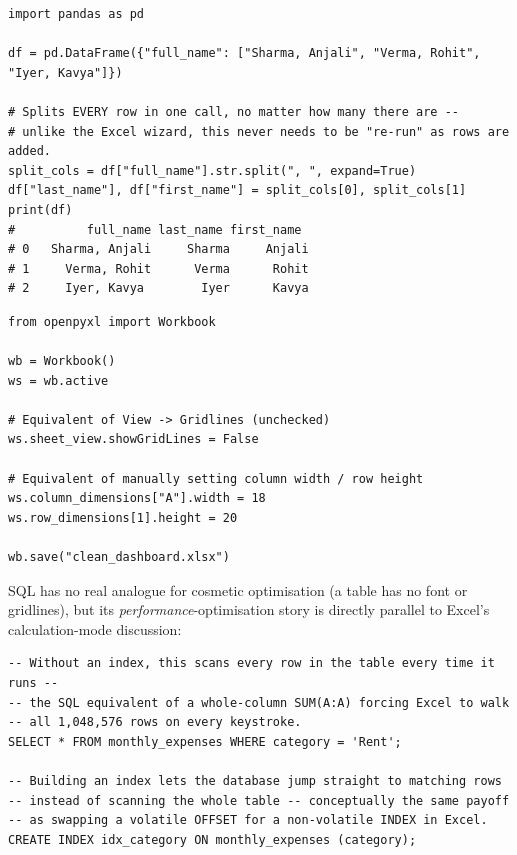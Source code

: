 \documentclass[11pt,a4paper]{article}
\begin{document}
\begin{lstlisting}[style=pythonstyle, caption={Text to Columns, the pandas way --- generalises automatically to any number of rows}]
import pandas as pd

df = pd.DataFrame({"full_name": ["Sharma, Anjali", "Verma, Rohit", "Iyer, Kavya"]})

# Splits EVERY row in one call, no matter how many there are --
# unlike the Excel wizard, this never needs to be "re-run" as rows are added.
split_cols = df["full_name"].str.split(", ", expand=True)
df["last_name"], df["first_name"] = split_cols[0], split_cols[1]
print(df)
#          full_name last_name first_name
# 0   Sharma, Anjali     Sharma     Anjali
# 1     Verma, Rohit      Verma      Rohit
# 2     Iyer, Kavya        Iyer      Kavya
\end{lstlisting}

\begin{lstlisting}[style=pythonstyle, caption={Cosmetic worksheet optimisation with openpyxl}]
from openpyxl import Workbook

wb = Workbook()
ws = wb.active

# Equivalent of View -> Gridlines (unchecked)
ws.sheet_view.showGridLines = False

# Equivalent of manually setting column width / row height
ws.column_dimensions["A"].width = 18
ws.row_dimensions[1].height = 20

wb.save("clean_dashboard.xlsx")
\end{lstlisting}

SQL has no real analogue for cosmetic optimisation (a table has no font or gridlines), but its \emph{performance}-optimisation story is directly parallel to Excel's calculation-mode discussion:

\begin{lstlisting}[style=sqlstyle, caption={SQL performance optimisation: an index is the closest relative of Excel's calculation-mode discipline}]
-- Without an index, this scans every row in the table every time it runs --
-- the SQL equivalent of a whole-column SUM(A:A) forcing Excel to walk
-- all 1,048,576 rows on every keystroke.
SELECT * FROM monthly_expenses WHERE category = 'Rent';

-- Building an index lets the database jump straight to matching rows
-- instead of scanning the whole table -- conceptually the same payoff
-- as swapping a volatile OFFSET for a non-volatile INDEX in Excel.
CREATE INDEX idx_category ON monthly_expenses (category);
\end{lstlisting}
\end{document}
